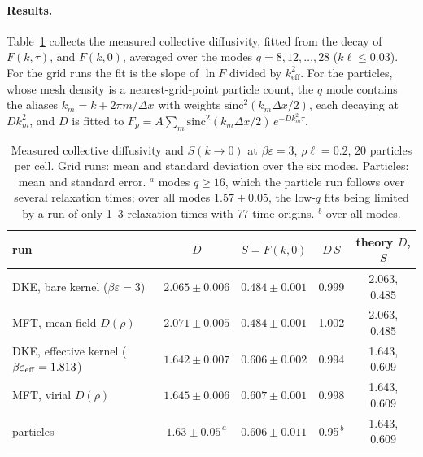 \documentclass[11pt]{article}
\newcommand{\keff}{k_{\mathrm{eff}}}
\begin{document}
\paragraph{Results.} Table~\ref{tab:ceff} collects the measured collective
diffusivity, fitted from the decay of $F(k,\tau)$, and $F(k,0)$, averaged over
the modes $q=8,12,\dots,28$ ($k\ell\le0.03$). For the grid runs the fit is the
slope of $\ln F$ divided by $\keff^2$. For the particles, whose mesh density is
a nearest-grid-point particle count, the $q$ mode contains the aliases
$k_m = k+2\pi m/\Delta x$ with weights $\mathrm{sinc}^2(k_m\Delta x/2)$, each
decaying at $Dk_m^2$, and $D$ is fitted to
$F_p = A\sum_m \mathrm{sinc}^2(k_m\Delta x/2)\,e^{-Dk_m^2\tau}$.

\begin{table}[h]
\centering
\begin{tabular}{lcccc}
\toprule
run & $D$ & $S=F(k,0)$ & $D\,S$ & theory $D$, $S$ \\
\midrule
DKE, bare kernel ($\beta\varepsilon=3$)        & $2.065\pm0.006$ & $0.484\pm0.001$ & 0.999 & 2.063, 0.485 \\
MFT, mean-field $D(\rho)$                      & $2.071\pm0.005$ & $0.484\pm0.001$ & 1.002 & 2.063, 0.485 \\
DKE, effective kernel ($\beta\varepsilon_{\rm eff}=1.813$) & $1.642\pm0.007$ & $0.606\pm0.002$ & 0.994 & 1.643, 0.609 \\
MFT, virial $D(\rho)$                          & $1.645\pm0.006$ & $0.607\pm0.001$ & 0.998 & 1.643, 0.609 \\
particles                                      & $1.63\pm0.05^{\,a}$ & $0.606\pm0.011$ & 0.95$^{\,b}$ & 1.643, 0.609 \\
\bottomrule
\end{tabular}
\caption{Measured collective diffusivity and $S(k\to0)$ at
$\beta\varepsilon=3$, $\rho\ell=0.2$, 20 particles per cell. Grid runs: mean
and standard deviation over the six modes. Particles: mean and standard error.
$^a$ modes $q\ge16$, which the particle run follows over several relaxation
times; over all modes $1.57\pm0.05$, the low-$q$ fits being limited by a run of
only 1--3 relaxation times with 77 time origins. $^b$ over all modes.}
\label{tab:ceff}
\end{table}
\end{document}
